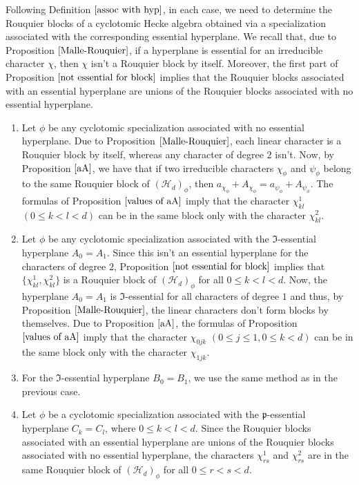 \documentclass[10pt,a4paper,titlepage]{article}
\begin{document}
\begin{apod}{Following Definition $\ref{assoc with hyp}$, in each case, we need to determine the Rouquier blocks of a cyclotomic Hecke algebra obtained via a specialization associated with the corresponding essential hyperplane. We recall that, due to Proposition $\ref{Malle-Rouquier}$, if a hyperplane is essential for an irreducible character $\chi$, then $\chi$ isn't a Rouquier block by itself.
Moreover, the first part of Proposition $\ref{not essential for block}$ implies that the Rouquier blocks associated with an essential hyperplane are unions of the Rouquier blocks associated with no essential hyperplane.
\begin{enumerate}[(1)]
\item Let $\phi$ be any cyclotomic specialization associated with no essential hyperplane. Due to Proposition $\ref{Malle-Rouquier}$, each linear character is a Rouquier block by itself, whereas any character of degree $2$ isn't. Now, by Proposition $\ref{aA}$, we have that if two irreducible characters 
 $\chi_\phi$ and $\psi_\phi$ belong to the same Rouquier block of $(\mathcal{H}_d)_\phi$, then
 $a_{\chi_\phi}+A_{\chi_\phi}=a_{\psi_\phi}+A_{\psi_\phi}.$ The formulas of Proposition $\ref{values of aA}$ imply that the character $\chi_{kl}^1$ $(0 \leq k<l<d)$ can  be in the same block only with the character $\chi_{kl}^2$.
\item Let $\phi$ be any cyclotomic specialization associated with the $\mathfrak{I}$-essential hyperplane
$A_0=A_1$. Since this isn't an essential hyperplane for the characters of degree $2$,
Proposition $\ref{not essential for block}$ implies that $\{\chi_{kl}^{1},\chi_{kl}^{2}\}$ is a Rouquier block of $(\mathcal{H}_d)_\phi$ for all $0 \leq k<l<d$. Now, the hyperplane $A_0=A_1$ is $\mathfrak{I}$-essential for all characters of degree $1$ and thus, by Proposition $\ref{Malle-Rouquier}$, the linear characters don't form blocks by themselves. Due to Proposition $\ref{aA}$, the  formulas of Proposition $\ref{values of aA}$ imply that the character $\chi_{0jk}$ $(0 \leq j\leq 1,0 \leq k<d)$ can be in the same block only with the character $\chi_{1jk}$.
\item For the  $\mathfrak{I}$-essential hyperplane $B_0=B_1$, we use the same method as in the previous case.
\item Let $\phi$ be a cyclotomic specialization associated with the $\mathfrak{p}$-essential hyperplane
$C_k=C_l$, where $0 \leq k<l<d$. Since the Rouquier blocks associated with an essential hyperplane are unions of the Rouquier blocks associated with no essential hyperplane, the characters 
 $\chi_{rs}^{1}$ and $\chi_{rs}^{2}$ are in the same Rouquier block of $(\mathcal{H}_d)_\phi$ for all $0 \leq r<s<d$.


\end{enumerate}}
\end{apod}
\end{document}
